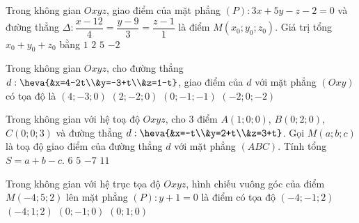 \begin{ex}%
Trong không gian $Oxyz$, giao điểm của mặt phẳng $(P):3x+5y-z-2=0$ và đường thẳng $\Delta:\dfrac{x-12}{4}=\dfrac{y-9}{3}=\dfrac{z-1}{1}$ là điểm $M\left(x_0;y_0;z_0\right)$. Giá trị tổng $x_0+y_0+z_0$ bằng
\choice
{$1$}
{$2$}
{$5$}
{\True $-2$}
\end{ex}

\begin{ex}%
Trong không gian $Oxyz$, cho đường thẳng $d:\heva{&x=4-2t\\&y=-3+t\\&z=1-t}$, giao điểm của $d$ với mặt phẳng $(Oxy)$ có tọa độ là
\choice
{$(4;-3;0)$}
{\True $(2;-2;0)$}
{$(0;-1;-1)$}
{$(-2;0;-2)$}
\end{ex}

\begin{ex}%
Trong không gian với hệ toạ độ $Oxyz$, cho $3$ điểm $A(1;0;0)$, $B(0;2;0)$, $C(0;0;3)$ và đường thẳng $d:\heva{&x=-t\\&y=2+t\\&z=3+t}$. Gọi $M(a;b;c)$ là toạ độ giao điểm của đường thẳng $d$ với mặt phẳng $(ABC)$. Tính tổng $S=a+b-c$.
\choice
{$6$}
{$5$}
{\True $-7$}
{$11$}
\end{ex}

\begin{ex}%
Trong không gian với hệ trục tọa độ $Oxyz$, hình chiếu vuông góc của điểm $M(-4;5;2)$ lên mặt phẳng $(P):y+1=0$ là điểm có tọa độ
\choice
{\True $(-4;-1;2)$}
{$(-4;1;2)$}
{$(0;-1;0)$}
{$(0;1;0)$}
\end{ex}

